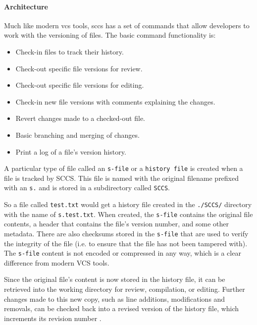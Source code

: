 \paragraph{Architecture}
Much like modern \acrshort{vcs} tools, \acrshort{sccs} has a set of commands that allow developers to work with the versioning of files. The basic command functionality is:
\begin{itemize}
    \item Check-in files to track their history.
    \item Check-out specific file versions for review.
    \item Check-out specific file versions for editing.
    \item Check-in new file versions with comments explaining the changes.
    \item Revert changes made to a checked-out file.
    \item Basic branching and merging of changes.
    \item Print a log of a file's version history.
\end{itemize}
A particular type of file called an \lstinline{s-file} or a \lstinline{history file} is created when a file is tracked by SCCS. This file is named with the original filename prefixed with an \lstinline{s.} and is stored in a subdirectory called \lstinline{SCCS}.
\smallskip

So a file called \lstinline{test.txt} would get a history file created in the \lstinline{./SCCS/} directory with the name of \lstinline{s.test.txt}. When created, the \lstinline{s-file} contains the original file contents, a header that contains the file's version number, and some other metadata. There are also checksums stored in the \lstinline{s-file} that are used to verify the integrity of the file (i.e. to ensure that the file has not been tampered with). The \lstinline{s-file} content is not encoded or compressed in any way, which is a clear difference from modern VCS tools.
\smallskip

Since the original file's content is now stored in the history file, it can be retrieved into the working directory for review, compilation, or editing. Further changes made to this new copy, such as line additions, modifications and removals, can be checked back into a revised version of the history file, which increments its revision number \cite{stopak_2019}.
\smallskip

